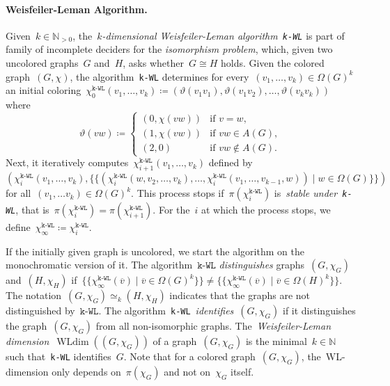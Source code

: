 \documentclass[english,a4paper]{article}
\theoremstyle{plain}
\theoremstyle{definition}
\newcommand{\Nat}{\ensuremath{\mathbb{N}}}
\newcommand{\vertices}{\ensuremath{\Omega}}
\newcommand{\arcs}{\ensuremath{A}}
\DeclareMathOperator*{\WLdim}{WLdim}
\newcommand{\wldim}[1]{\ensuremath{\WLdim\left(#1\right)}}
\newcommand{\wld}[1]{\texttt{#1-WL}}
\newcommand{\wldstable}[2]{\ensuremath{#2^{\wld{#1}}_{\infty}}}
\newcommand{\coloring}{\ensuremath{\chi}}
\newcommand{\coloredGraph}{\ensuremath{(G,\coloring)}}
\begin{document}
\paragraph{Weisfeiler-Leman Algorithm.}
Given~$k \in \Nat_{>0}$, the~\emph{$k$-dimensional Weisfeiler-Leman algorithm~\wld{k}} is part of family of incomplete deciders for the \emph{isomorphism problem}, which, given two uncolored graphs~$G$ and~$H$, asks whether~$G \cong H$ holds.
Given the colored graph~$\coloredGraph$, the algorithm~\wld{k} determines for every~$(v_1, \dots, v_k) \in \vertices(G)^k$ an initial coloring~$\coloring^{\wld{k}}_0(v_1, \dots, v_k) \coloneqq (\vartheta(v_1v_1),\vartheta(v_1v_2), \dots, \vartheta(v_kv_k))$ where
\begin{equation*}
    \vartheta(vw) \coloneqq
    \begin{cases}
        (0,\coloring(vw)) & \text{if } v = w, \\
        (1,\coloring(vw)) & \text{if } vw \in \arcs(G), \\
        (2,0) & \text{if } vw \notin \arcs(G).
    \end{cases}
\end{equation*}
Next, it iteratively computes~$\coloring^{\wld{k}}_{i+1}(v_1,\dots,v_k)$ defined by
\begin{equation*}
    (
        \coloring^{\wld{k}}_{i}(v_1,\dots,v_k),
        \{\!\!\{
            (\coloring^{\wld{k}}_{i}(w,v_2,\dots,v_k),\dots,\coloring^{\wld{k}}_{i}(v_1,\dots,v_{k-1},w)) \mid w \in \vertices(G)
        \}\!\!\}
    )
\end{equation*}
for all~$(v_1, \dots v_k) \in \vertices(G)^k$.
This process stops if~$\pi(\coloring^{\wld{k}}_{i})$ is~\emph{stable under~\wld{k}}, that is~$\pi(\coloring^{\wld{k}}_{i}) = \pi(\coloring^{\wld{k}}_{i + 1})$.
For the~$i$ at which the process stops, we define~$\wldstable{k}{\coloring}\coloneqq \coloring^{\wld{k}}_{i}$.

If the initially given graph is uncolored, we start the algorithm on the monochromatic version of it.
The algorithm~$\wld{k}$ \emph{distinguishes} graphs~$(G,\coloring_G)$ and~$(H,\coloring_H)$ if~$\{\!\!\{ \wldstable{k}{\coloring}(\overline{v}) \mid \overline{v} \in \vertices(G)^k \}\!\!\} \neq \{\!\!\{ \wldstable{k}{\coloring}(\overline{v}) \mid \overline{v} \in \vertices(H)^k \}\!\!\}$. The notation~$(G,\coloring_G) \simeq_k (H,\coloring_H)$ indicates that the graphs are not distinguished by~$\wld{k}$.
The algorithm~\wld{k}~\emph{identifies}~$(G,\coloring_G)$ if it distinguishes the graph~$(G,\coloring_G)$ from all non-isomorphic graphs. The~\emph{Weisfeiler-Leman dimension}~$\wldim{(G,\coloring_G)}$ of a graph~$(G,\coloring_G)$ is the minimal~$k \in \Nat$ such that~\wld{k} identifies~$G$. Note that for a colored graph~$(G,\coloring_G)$, the~WL-dimension only depends on~$\pi(\coloring_G)$ and not on~$\coloring_G$ itself.
\end{document}
